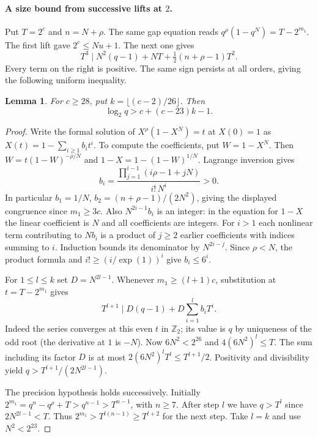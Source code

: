 \documentclass[11pt]{article}
\newtheorem{lemma}{Lemma}
\begin{document}
\paragraph{A size bound from successive lifts at $2$.}
Put $T=2^c$ and $n=N+\rho$. The same gap equation reads
$q^\rho(1-q^N)=T-2^{m_1}$. The first lift gave $2^c\le Nu+1$.
The next one gives
\[
 T^3\mid N^2(q-1)+NT+\tfrac12(n+\rho-1)T^2.
\]
Every term on the right is positive. The same sign persists at all
orders, giving the following uniform inequality.
\begin{lemma}\label{lem:lift-size}
For $c\ge28$, put $k=\lfloor(c-2)/26\rfloor$. Then
\[
 \log_2 q>c+(c-23)k-1.
\]
\end{lemma}
\begin{proof}
Write the formal solution of $X^\rho(1-X^N)=t$ at $X(0)=1$
as $X(t)=1-\sum_{i\ge1}b_i t^i$. To compute the coefficients,
put $W=1-X^N$. Then $W=t(1-W)^{-\rho/N}$ and
$1-X=1-(1-W)^{1/N}$. Lagrange inversion gives
\[
 b_i=\frac{\prod_{j=1}^{i-1}(i\rho-1+jN)}{i!\,N^i}>0 .
\]
In particular $b_1=1/N$, $b_2=(n+\rho-1)/(2N^2)$,
giving the displayed congruence since $m_1\ge3c$.
Also $N^{2i-1}b_i$ is an integer: in the equation for $1-X$
the linear coefficient is $N$ and all coefficients are integers.
For $i>1$ each nonlinear term contributing to $Nb_i$ is a
product of $j\ge2$ earlier coefficients with indices summing to $i$.
Induction bounds its denominator by $N^{2i-j}$.
Since $\rho<N$, the product formula and $i!\ge(i/\exp(1))^i$
give $b_i\le6^i$.

For $1\le l\le k$ set $D=N^{2l-1}$. Whenever $m_1\ge(l+1)c$,
substitution at $t=T-2^{m_1}$ gives
\[
 T^{l+1}\mid D(q-1)+D\sum_{i=1}^l b_iT^i.
\]
Indeed the series converges at this even $t$ in $\mathbb Z_2$;
its value is $q$ by uniqueness of the odd root (the derivative
at $1$ is $-N$). Now $6N^2<2^{26}$ and $4(6N^2)^l\le T$.
The sum including its factor $D$ is at most
$2(6N^2)^lT^l\le T^{l+1}/2$. Positivity and divisibility yield
$q>T^{l+1}/(2N^{2l-1})$.

The precision hypothesis holds successively. Initially
$2^{m_1}=q^n-q^\rho+T>q^{n-1}>T^{n-1}$, with $n\ge7$.
After step $l$ we have $q>T^l$ since $2N^{2l-1}<T$.
Thus $2^{m_1}>T^{l(n-1)}\ge T^{l+2}$ for the next step.
Take $l=k$ and use $N^2<2^{23}$.
\end{proof}
\end{document}
